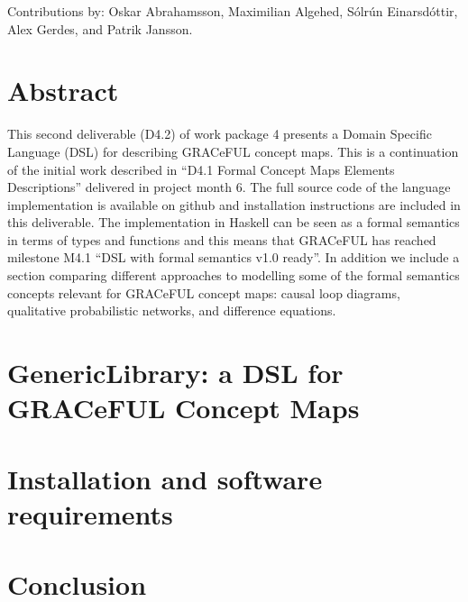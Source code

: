 \documentclass[]{article}
\begin{document}
Contributions by: Oskar Abrahamsson, Maximilian Algehed, Sólrún
Einarsdóttir, Alex Gerdes, and Patrik Jansson.

\vfill

\setcounter{tocdepth}{2}
\tableofcontents

\vfill

\newpage

\section*{Abstract}\label{abstract}

This second deliverable (D4.2) of work package 4 presents a Domain
Specific Language (DSL) for describing GRACeFUL concept maps.
%
This is a continuation of the initial work described in ``D4.1 Formal
Concept Maps Elements Descriptions'' delivered in project month 6.
%
The full source code of the language implementation is available on
github and installation instructions are included in this deliverable.
%
The implementation in Haskell can be seen as a formal semantics in
terms of types and functions and this means that GRACeFUL has reached
milestone M4.1 ``DSL with formal semantics v1.0 ready''.
%
In addition we include a section comparing different approaches to
modelling some of the formal semantics concepts relevant for GRACeFUL
concept maps: causal loop diagrams, qualitative probabilistic
networks, and difference equations.





\section{GenericLibrary: a DSL for GRACeFUL Concept Maps}
\label{sec:gl}





\section{Installation and software requirements}
\label{install-and-reqs}






\section{Conclusion}
\end{document}
